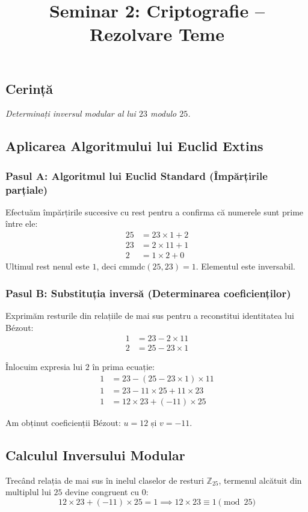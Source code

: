 \documentclass[12pt]{article}
\title{Seminar 2: Criptografie -- Rezolvare Teme}
\author{}
\date{} %
\begin{document}
\maketitle


\subsection*{Cerință}
\textit{Determinați inversul modular al lui $23$ modulo $25$.}


\subsection*{ Aplicarea Algoritmului lui Euclid Extins}

\subsubsection*{Pasul A: Algoritmul lui Euclid Standard (Împărțirile parțiale)}
Efectuăm împărțirile succesive cu rest pentru a confirma că numerele sunt prime între ele:
\begin{align*}
25 &= 23 \times 1 + 2 \\
23 &= 2 \times 11 + 1 \\
2 &= 1 \times 2 + 0
\end{align*}
Ultimul rest nenul este $1$, deci $\text{cmmdc}(25, 23) = 1$. Elementul este inversabil.

\subsubsection*{Pasul B: Substituția inversă (Determinarea coeficienților)}
Exprimăm resturile din relațiile de mai sus pentru a reconstitui identitatea lui Bézout:
\begin{align*}
1 &= 23 - 2 \times 11 \\
2 &= 25 - 23 \times 1
\end{align*}

Înlocuim expresia lui $2$ în prima ecuație:
\begin{align*}
1 &= 23 - (25 - 23 \times 1) \times 11 \\
1 &= 23 - 11 \times 25 + 11 \times 23 \\
1 &= 12 \times 23 + (-11) \times 25
\end{align*}

Am obținut coeficienții Bézout: $u = 12$ și $v = -11$.

\subsection*{Calculul Inversului Modular}
Trecând relația de mai sus în inelul claselor de resturi $\mathbb{Z}_{25}$, termenul alcătuit din multiplul lui $25$ devine congruent cu $0$:
\[
12 \times 23 + (-11) \times 25 = 1 \implies 12 \times 23 \equiv 1 \pmod{25}
\]
\end{document}
